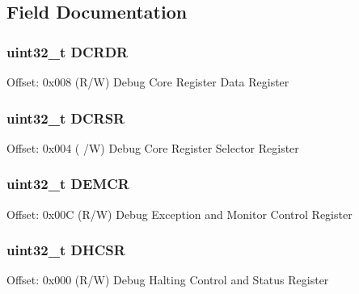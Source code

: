 \subsection{Field Documentation}
\hypertarget{struct_core_debug___type_a5bcffe99d1d5471d5e5befbc6272ebf0}{
\subsubsection[{D\-C\-R\-D\-R}]{ uint32\-\_\-t D\-C\-R\-D\-R}}\label{struct_core_debug___type_a5bcffe99d1d5471d5e5befbc6272ebf0}
Offset\-: 0x008 (R/\-W) Debug Core Register Data Register \hypertarget{struct_core_debug___type_a7b49cb58573da77cc8a83a1b21262180}{
\subsubsection[{D\-C\-R\-S\-R}]{ uint32\-\_\-t D\-C\-R\-S\-R}}\label{struct_core_debug___type_a7b49cb58573da77cc8a83a1b21262180}
Offset\-: 0x004 ( /\-W) Debug Core Register Selector Register \hypertarget{struct_core_debug___type_a6cdfc0a6ce3e988cc02c2d6e8107d193}{
\subsubsection[{D\-E\-M\-C\-R}]{ uint32\-\_\-t D\-E\-M\-C\-R}}\label{struct_core_debug___type_a6cdfc0a6ce3e988cc02c2d6e8107d193}
Offset\-: 0x00\-C (R/\-W) Debug Exception and Monitor Control Register \hypertarget{struct_core_debug___type_a39bc5e68dc6071187fbe2348891eabfa}{
\subsubsection[{D\-H\-C\-S\-R}]{ uint32\-\_\-t D\-H\-C\-S\-R}}\label{struct_core_debug___type_a39bc5e68dc6071187fbe2348891eabfa}
Offset\-: 0x000 (R/\-W) Debug Halting Control and Status Register 


